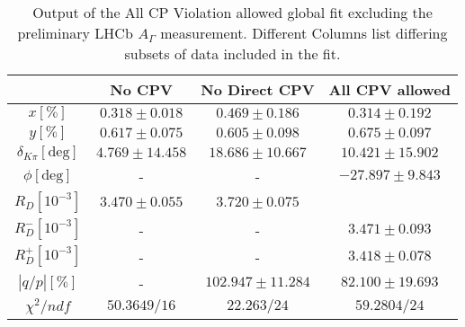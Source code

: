 \begin{table}[htdp]

\begin{center}
\begin{tabular}{|c||c||c||c|}
\hline
& No CPV & No Direct CPV & All CPV allowed \\ \hline

$x[\%]                    $ &$0.318\pm 0.018$ &$0.469\pm 0.186$ & $0.314\pm 0.192$\\ \hline

$y[\%]                    $ &$0.617\pm 0.075$ &$0.605\pm 0.098$ & $0.675\pm 0.097$\\ \hline

$\delta_{K\pi}[\text{deg}]$ &$4.769\pm 14.458$ &$18.686\pm 10.667$ &$10.421\pm 15.902$ \\ \hline

$\phi[\text{deg}]         $ &- &- &$-27.897\pm 9.843$ \\ \hline

$R_D[10^{-3}]             $ &$3.470\pm 0.055$ &$3.720\pm 0.075$ & \\ \hline

$R_D^-[10^{-3}]           $ &- &- &$3.471\pm 0.093$ \\ \hline

$R_D^+[10^{-3}]           $ &- &- &$3.418\pm 0.078$ \\ \hline

$|q/p|[\%]                $ &- &$102.947\pm 11.284$ &$82.100\pm 19.693$ \\ \hline

$\chi^2/ndf               $ &$50.3649/16$ &$22.263/24$ &$59.2804/24$ \\ \hline

\end{tabular}
\end{center}
\caption{Output of the All CP Violation allowed global fit excluding the preliminary LHCb $A_\Gamma$ measurement. Different Columns list 
differing subsets of data included in the fit.}
\label{table:hfag_2013_april_table}
\end{table}%
